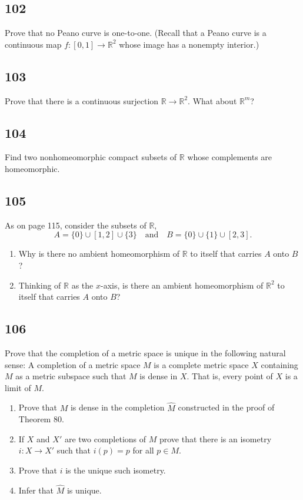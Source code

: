 \documentclass{amsart}
\begin{document}
\subsection*{102}
Prove that no Peano curve is one-to-one. (Recall that a Peano curve is a continuous map $f : [0,1] \to \mathbb{R}^2$ whose image has a nonempty interior.)

\subsection*{103}
Prove that there is a continuous surjection $\mathbb{R} \to \mathbb{R}^2$. What about $\mathbb{R}^m$?

\subsection*{104}
Find two nonhomeomorphic compact subsets of $\mathbb{R}$ whose complements are homeomorphic.

\subsection*{105}
As on page 115, consider the subsets of $\mathbb{R}$,
\[
A = \{0\} \cup [1,2] \cup \{3\} \quad \text{and} \quad B = \{0\} \cup \{1\} \cup [2,3].
\]
\begin{enumerate}[label=(\alph*)]
\item Why is there no ambient homeomorphism of $\mathbb{R}$ to itself that carries $A$ onto $B$?
\item Thinking of $\mathbb{R}$ as the $x$-axis, is there an ambient homeomorphism of $\mathbb{R}^2$ to itself that carries $A$ onto $B$?
\end{enumerate}

\subsection*{106}
Prove that the completion of a metric space is unique in the following natural sense: A completion of a metric space $M$ is a complete metric space $X$ containing $M$ as a metric subspace such that $M$ is dense in $X$. That is, every point of $X$ is a limit of $M$.
\begin{enumerate}[label=(\alph*)]
\item Prove that $M$ is dense in the completion $\widehat{M}$ constructed in the proof of Theorem 80.
\item If $X$ and $X'$ are two completions of $M$ prove that there is an isometry $i : X \to X'$ such that $i(p) = p$ for all $p \in M$.
\item Prove that $i$ is the unique such isometry.
\item Infer that $\widehat{M}$ is unique.
\end{enumerate}
\end{document}
